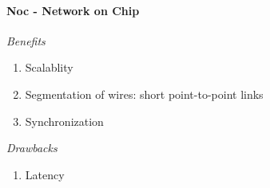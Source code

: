 \documentclass[english]{latex4ei/latex4ei_sheet}
\begin{document}
\paragraph{Noc - Network on Chip}
\textit{Benefits}
\begin{enumerate}
    \item Scalablity
    \item Segmentation of wires: short point-to-point links
    \item Synchronization
\end{enumerate}
\textit{Drawbacks}
\begin{enumerate}
    \item Latency
\end{enumerate}
\end{document}
